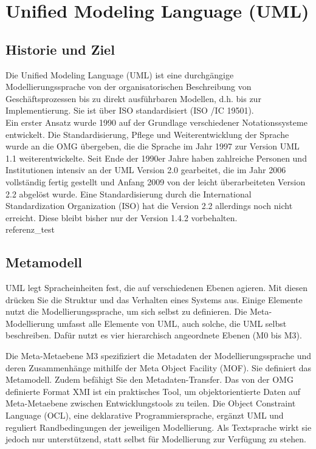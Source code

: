 
\section{Unified Modeling Language (UML)}

\subsection{Historie und Ziel}
Die Unified Modeling Language (UML) ist eine durchgängige Modellierungssprache von der
organisatorischen Beschreibung von Geschäftsprozessen bis zu direkt ausführbaren Modellen,
d.h. bis zur Implementierung. Sie ist über ISO standardisiert (ISO /IC 19501).\\
Ein erster Ansatz wurde 1990 auf der Grundlage verschiedener Notationssysteme entwickelt.
Die Standardisierung, Pflege und Weiterentwicklung der Sprache wurde an die OMG
übergeben, die die Sprache im Jahr 1997 zur Version UML 1.1 weiterentwickelte. Seit Ende der
1990er Jahre haben zahlreiche Personen und Institutionen intensiv an der UML Version 2.0
gearbeitet, die im Jahr 2006 vollständig fertig gestellt und Anfang 2009 von der leicht
überarbeiteten Version 2.2 abgelöst wurde. Eine Standardisierung durch die International
Standardization Organization (ISO) hat die Version 2.2 allerdings noch nicht erreicht. Diese
bleibt bisher nur der Version 1.4.2 vorbehalten.
\\ referenz_test \cite{MT001}
\subsection{Metamodell} 
UML legt Spracheinheiten fest, die auf verschiedenen Ebenen agieren. Mit diesen drücken Sie die Struktur und das Verhalten eines Systems aus. Einige Elemente nutzt die Modellierungssprache, um sich selbst zu definieren. Die Meta-Modellierung umfasst alle Elemente von UML, auch solche, die UML selbst beschreiben. Dafür nutzt es vier hierarchisch angeordnete Ebenen (M0 bis M3).

Die Meta-Metaebene M3 spezifiziert die Metadaten der Modellierungssprache und deren Zusammenhänge mithilfe der Meta Object Facility (MOF). Sie definiert das Metamodell. Zudem befähigt Sie den Metadaten-Transfer. Das von der OMG definierte Format XMI ist ein praktisches Tool, um objektorientierte Daten auf Meta-Metaebene zwischen Entwicklungstools zu teilen. Die Object Constraint Language (OCL), eine deklarative Programmiersprache, ergänzt UML und reguliert Randbedingungen der jeweiligen Modellierung. Als Textsprache wirkt sie jedoch nur unterstützend, statt selbst für Modellierung zur Verfügung zu stehen.\\

